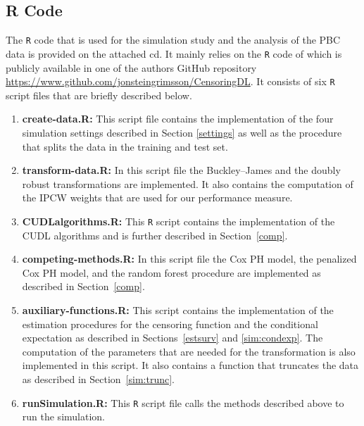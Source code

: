 \documentclass[12pt, a4paper]{scrartcl}
\theoremstyle{definition}
\theoremstyle{plain}
\numberwithin{equation}{section}
\numberwithin{figure}{section}
\numberwithin{table}{section}
\begin{document}
\begin{appendices}
		\section{R Code}
		The \texttt{R} code that is used for the simulation study and the analysis of the PBC data is provided on the attached cd.
		It mainly relies on the \texttt{R} code of \citet*{basearticle} which is publicly available in one of the authors GitHub repository \url{https://www.github.com/jonsteingrimsson/CensoringDL}.
		It consists of six \texttt{R} script files that are briefly described below.
		\begin{enumerate}
			\item \textbf{create-data.R:} This script file contains the implementation of the four simulation settings described in Section \ref{settings} as well as the procedure that splits the data in the training and test set.
			\item \textbf{transform-data.R:} In this script file the Buckley--James and the doubly robust transformations are implemented. It also contains the computation of the IPCW weights that are used for our performance measure.
			\item \textbf{CUDLalgorithms.R:} This \texttt{R} script contains the implementation of the CUDL algorithms and is further described in Section~\ref{comp}.
			\item \textbf{competing-methods.R:} In this script file the Cox PH model, the penalized Cox PH model, and the random forest procedure are implemented as described in Section~\ref{comp}.
			\item \textbf{auxiliary-functions.R:} This script contains the implementation of the estimation procedures for the censoring function and the conditional expectation as described in Sections~\ref{estsurv} and \ref{sim:condexp}.
			The computation of the parameters that are needed for the transformation is also implemented in this script.
			It also contains a function that truncates the data as described in Section~\ref{sim:trunc}.
			\item \textbf{runSimulation.R:} This \texttt{R} script file calls the methods described above to run the simulation.
		\end{enumerate}
		
	\end{appendices}
	
\end{document}
